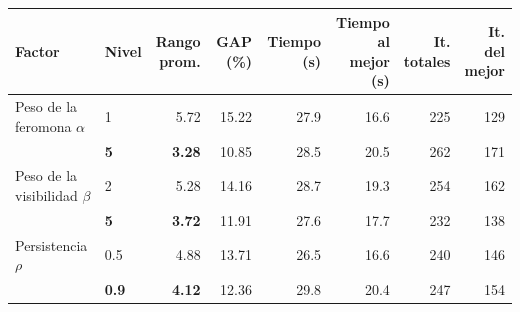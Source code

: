 \begin{tabular}{llrrrrrr}
\toprule
Factor & Nivel & \makecell{Rango\\prom.} & GAP (\%) & Tiempo (s) & \makecell{Tiempo al\\mejor (s)} & \makecell{It.\\totales} & \makecell{It. del\\mejor} \\
\midrule
Peso de la feromona $\alpha$ & 1 & 5.72 & 15.22 & 27.9 & 16.6 & 225 & 129 \\
 & \textbf{5} & \textbf{3.28} & 10.85 & 28.5 & 20.5 & 262 & 171 \\
\addlinespace
Peso de la visibilidad $\beta$ & 2 & 5.28 & 14.16 & 28.7 & 19.3 & 254 & 162 \\
 & \textbf{5} & \textbf{3.72} & 11.91 & 27.6 & 17.7 & 232 & 138 \\
\addlinespace
Persistencia $\rho$ & 0.5 & 4.88 & 13.71 & 26.5 & 16.6 & 240 & 146 \\
 & \textbf{0.9} & \textbf{4.12} & 12.36 & 29.8 & 20.4 & 247 & 154 \\
\bottomrule
\end{tabular}
